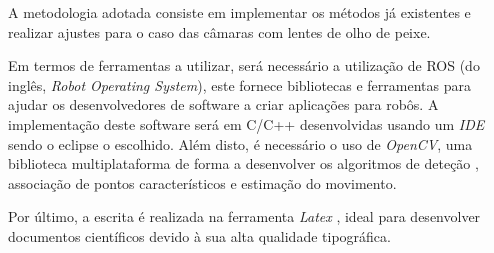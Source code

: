 A metodologia adotada consiste em implementar os métodos já existentes e realizar ajustes para o caso das câmaras com lentes de olho de peixe. 

Em termos de ferramentas a utilizar, será necessário a utilização de ROS (do inglês, \textit{Robot Operating System}), este fornece bibliotecas e ferramentas para ajudar os desenvolvedores de software a criar aplicações para robôs. A implementação deste software será em C/C++ desenvolvidas usando um \textit{IDE} sendo o eclipse o escolhido. Além disto, é necessário o uso de \textit{OpenCV}, uma biblioteca multiplataforma de forma a desenvolver os algoritmos de deteção , associação de pontos característicos e estimação do movimento.

Por último, a escrita é realizada na ferramenta \textit{Latex} , ideal para desenvolver documentos científicos devido à sua alta qualidade tipográfica.